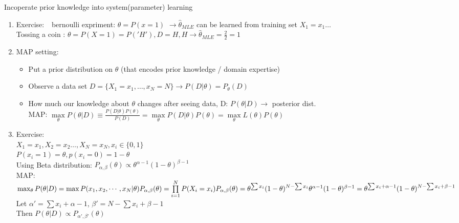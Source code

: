 \documentclass[12pt]{article}
\newcommand{\exe}{{\color{green} Exercise: $\ $}}
\begin{document}
        Incoperate prior knowledge into system(parameter) learning
        \begin{enumerate}
            \item \exe \ bernoulli expriment: $\theta = P(x = 1)$
            $\rightarrow  \hat{\theta}_{MLE}$ can be learned from training set $X_1 = x_1 \dots$\\
            Tossing a coin : $\theta = P(X = 1) = P('H'), D = {H,H} \rightarrow \hat{\theta}_{MLE} = \frac{2}{2} = 1$
            \item MAP setting:
            \begin{itemize}
                \item  Put a prior distribution on $\theta$ (that encodes prior knowledge / domain expertise)
                \item Observe a data set $ D = \{X_1 = x_1, \dots, x_N =  N \} \rightarrow P(D | \theta) = P_\theta(D)$
                \item How much our knowledge about $\theta$ changes after seeing data, D: $P(\theta | D) \rightarrow$ posterior dist.\\
                MAP: $\max\limits_{\theta} P(\theta | D) \equiv \frac{P(D|\theta)P(\theta)}{P(D)} = \max\limits_\theta P(D|\theta)P(\theta) = \max\limits_\theta L(\theta)P(\theta)$
            \end{itemize}
            \item \exe \\
                $X_1 = x_1, X_2 = x_2 \dots, X_N = x_N, x_i \in \{0,1\}$\\
                $P(x_i = 1) = \theta, p(x_i = 0) = 1- \theta$\\
                Using Beta distribution: $P_{\alpha,\beta}(\theta) \propto \theta^{\alpha - 1}(1-\theta)^{\beta - 1}$\\
                MAP: $\max_\theta P(\theta | D) = \max P(x_1, x_2, \cdots, x_N | \theta)P_{\alpha, \beta}(\theta)\\
                = \prod\limits_{i = 1}^{N}P(X_i = x_i)P_{\alpha, \beta}(\theta)\\
                = \theta^{\sum x_i}(1-\theta)^{N - \sum x_i}\theta^{\alpha - 1}(1- \theta)^{\beta - 1} \\ 
                = \theta^{\sum x_i + \alpha - 1} (1-\theta)^{N - \sum x_i + \beta - 1}$\\
                Let $\alpha' = \sum x_i + \alpha - 1 $, $\beta' = N - \sum x_i + \beta - 1$\\
                Then $P(\theta | D) \propto P_{\alpha', \beta'}(\theta)$\\

\end{enumerate}
\end{document}

